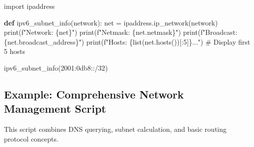 \documentclass[
  letterpaper,
  DIV=11,
  numbers=noendperiod]{scrreprt}
\newenvironment{Shaded}{\begin{snugshade}}{\end{snugshade}}
\newcommand{\BuiltInTok}[1]{\textcolor[rgb]{0.00,0.23,0.31}{#1}}
\newcommand{\CommentTok}[1]{\textcolor[rgb]{0.37,0.37,0.37}{#1}}
\newcommand{\DecValTok}[1]{\textcolor[rgb]{0.68,0.00,0.00}{#1}}
\newcommand{\ImportTok}[1]{\textcolor[rgb]{0.00,0.46,0.62}{#1}}
\newcommand{\KeywordTok}[1]{\textcolor[rgb]{0.00,0.23,0.31}{\textbf{#1}}}
\newcommand{\NormalTok}[1]{\textcolor[rgb]{0.00,0.23,0.31}{#1}}
\newcommand{\OperatorTok}[1]{\textcolor[rgb]{0.37,0.37,0.37}{#1}}
\newcommand{\SpecialCharTok}[1]{\textcolor[rgb]{0.37,0.37,0.37}{#1}}
\newcommand{\SpecialStringTok}[1]{\textcolor[rgb]{0.13,0.47,0.30}{#1}}
\newcommand{\StringTok}[1]{\textcolor[rgb]{0.13,0.47,0.30}{#1}}
\begin{document}
\begin{Shaded}
\begin{Highlighting}[]
\ImportTok{import}\NormalTok{ ipaddress}

\KeywordTok{def}\NormalTok{ ipv6\_subnet\_info(network):}
\NormalTok{    net }\OperatorTok{=}\NormalTok{ ipaddress.ip\_network(network)}
    \BuiltInTok{print}\NormalTok{(}\SpecialStringTok{f"Network: }\SpecialCharTok{\{}\NormalTok{net}\SpecialCharTok{\}}\SpecialStringTok{"}\NormalTok{)}
    \BuiltInTok{print}\NormalTok{(}\SpecialStringTok{f"Netmask: }\SpecialCharTok{\{}\NormalTok{net}\SpecialCharTok{.}\NormalTok{netmask}\SpecialCharTok{\}}\SpecialStringTok{"}\NormalTok{)}
    \BuiltInTok{print}\NormalTok{(}\SpecialStringTok{f"Broadcast: }\SpecialCharTok{\{}\NormalTok{net}\SpecialCharTok{.}\NormalTok{broadcast\_address}\SpecialCharTok{\}}\SpecialStringTok{"}\NormalTok{)}
    \BuiltInTok{print}\NormalTok{(}\SpecialStringTok{f"Hosts: }\SpecialCharTok{\{}\BuiltInTok{list}\NormalTok{(net.hosts())[:}\DecValTok{5}\NormalTok{]}\SpecialCharTok{\}}\SpecialStringTok{..."}\NormalTok{)  }\CommentTok{\# Display first 5 hosts}

\NormalTok{ipv6\_subnet\_info(}\StringTok{\textquotesingle{}2001:0db8::/32\textquotesingle{}}\NormalTok{)}
\end{Highlighting}
\end{Shaded}

\subsection{Example: Comprehensive Network Management
Script}\label{example-comprehensive-network-management-script}

This script combines DNS querying, subnet calculation, and basic routing
protocol concepts.
\end{document}
